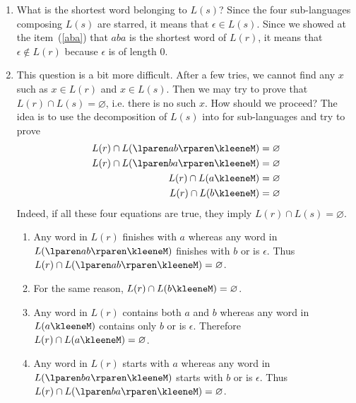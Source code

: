 \begin{enumerate}
    \item What is the shortest word belonging to \(L(s)\)?
      Since the four sub-languages composing \(L(s)\) are starred, it
      means that \(\epsilon \in L(s)\). Since we showed at the
      item~(\ref{aba}) that \(aba\) is the shortest word of \(L(r)\),
      it means that \(\epsilon \not\in L(r)\) because \(\epsilon\) is
      of length \(0\).

    \item This question is a bit more difficult. After a few
      tries, we cannot find any \(x\) such as \(x \in L(r)\) and \(x
      \in L(s)\). Then we may try to prove that \(L(r) \cap L(s) =
      \varnothing\), i.e. there is no such \(x\). How should we
      proceed? The idea is to use the decomposition of \(L(s)\) into
      for sub-languages and try to prove
      \begin{align*}
        L(r) \cap L(\lparen ab \rparen\kleeneM) &= \varnothing\\
        L(r) \cap L(\lparen ba \rparen\kleeneM) &= \varnothing\\
        L(r) \cap L(a\kleeneM) &= \varnothing\\
        L(r) \cap L(b\kleeneM) &= \varnothing
      \end{align*}
      Indeed, if all these four equations are true, they imply
        \(L(r) \cap L(s) = \varnothing\).
      \begin{enumerate}

        \item Any word in \(L(r)\) finishes with \(a\) whereas any
          word in \(L(\lparen ab \rparen\kleeneM)\) finishes with
          \(b\) or is \(\epsilon\). Thus \(L(r) \cap L(\lparen ab
          \rparen\kleeneM) = \varnothing\).

        \item For the same reason, \(L(r) \cap L(b\kleeneM) =
          \varnothing\).
 
        \item Any word in \(L(r)\) contains both \(a\) and \(b\)
          whereas any word in \(L(a\kleeneM)\) contains only \(b\) or
          is \(\epsilon\). Therefore \(L(r) \cap L(a\kleeneM) =
          \varnothing\).

        \item Any word in \(L(r)\) starts with \(a\) whereas any
          word in \(L(\lparen ba \rparen\kleeneM)\) starts with
          \(b\) or is \(\epsilon\). Thus \(L(r) \cap L(\lparen ba
          \rparen\kleeneM) = \varnothing\).


\end{enumerate}
\end{enumerate}
